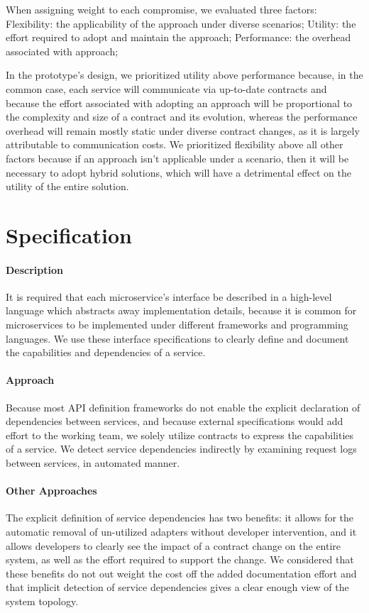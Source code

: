 When assigning weight to each compromise, we evaluated three factors:
Flexibility: the applicability of the approach under diverse scenarios;
Utility: the effort required to adopt and maintain the approach;
Performance: the overhead associated with approach;

In the prototype's design, we prioritized utility above performance because,
in the common case, each service will communicate via up-to-date contracts and
because the effort associated with adopting an approach will be proportional to the complexity and size of a contract and its evolution,
whereas the performance overhead will remain mostly static under diverse contract changes, as it is largely attributable to communication costs.
We prioritized flexibility above all other factors because if an approach isn't applicable under a scenario,
then it will be necessary to adopt hybrid solutions, which will have a detrimental effect on the utility of the entire solution.

\section{Specification} %
\label{sec:specification}

\paragraph{Description}
It is required that each microservice’s interface be
described in a high-level language which abstracts away implementation details, because it is common
for microservices to be implemented under different frameworks and programming languages.
We use these interface specifications to clearly define and document the capabilities and dependencies of a service.

\paragraph{Approach}
Because most API definition frameworks do not enable the explicit declaration of dependencies between services,
and because external specifications would add effort to the working team, we solely utilize contracts to express the capabilities of a service.
We detect service dependencies indirectly by examining request logs between services, in automated manner.

\paragraph{Other Approaches}
The explicit definition of service dependencies has two benefits: it allows for the automatic removal of un-utilized adapters without developer intervention,
and it allows developers to clearly see the impact of a contract change on the entire system, as well as the effort required to support the change.
We considered that these benefits do not out weight the cost off the added documentation effort and that implicit detection of service
dependencies gives a clear enough view of the system topology.

